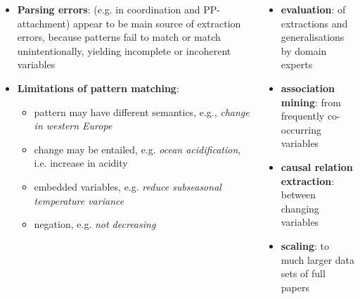 \documentclass[24pt, a0papper, portrait]{tikzposter}
\newcommand{\point}[1]{\textbf{\textcolor{colorThree}{#1}}:}
\begin{document}
\begin{columns}
{  
\begin{itemize}
\item \point{Parsing errors} (e.g. in coordination and PP-attachment) appear to be main source of extraction errors, because patterns fail to match or match unintentionally, yielding incomplete or incoherent variables 
\item \point{Limitations of pattern matching}
\begin{itemize}
\item pattern may have different semantics, e.g., \emph{change in western Europe}
\item change may be entailed, e.g. \emph{ocean acidification}, i.e. increase in acidity 
\item embedded variables, e.g. \emph{reduce subseasonal temperature variance}
\item negation, e.g. \emph{not decreasing}
\end{itemize}
\end{itemize}    
}

{  
\begin{itemize}
\item \point{evaluation} of extractions and generalisations by domain experts
\item \point{association mining} from frequently co-occurring variables
\item \point{causal relation extraction} between changing variables
\item \point{scaling} to much larger data sets of full papers   
\end{itemize}    

}

\end{columns}

 
\end{document}
